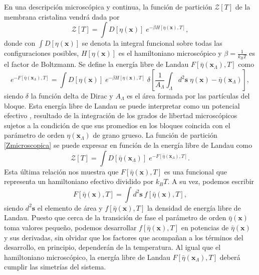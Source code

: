 En una descripción microscópica y continua, la función de partición
$\mathcal{Z}[T]$ de la membrana cristalina vendrá dada por
\begin{equation}\label{Zmicroscopica}
\mathcal{Z}[T]=\int D[\eta(\mathbf{x})]\; e^{-\beta H[\eta(\mathbf{x}),T]},
\end{equation}
donde con $\int D[\eta(\mathbf{x})]$ se denota la integral funcional sobre
todas las configuraciones posibles, $H[\eta(\mathbf{x})]$ es el hamiltoniano
microscópico y $\beta=\frac{1}{k_BT}$ es el factor de Boltzmann. Se define la
energía libre de Landau $F[\bar{\eta}(\mathbf{x}_{\Lambda}),T]$ como 
\begin{equation*}
e^{-F[\bar{\eta}(\mathbf{x}_{\Lambda}),T]}=\int D[\eta(\mathbf{x})]\; e^{-\beta
  H[\eta(\mathbf{x}),T]}
  \;\delta\left[\frac{1}{A_{\Lambda}}\int_{\Lambda} d^2\mathbf{s}\; \eta(\mathbf{x})-\bar{\eta}(\mathbf{x}_{\Lambda})\right],
\end{equation*}
siendo $\delta$ la función delta de Dirac y $A_{\Lambda}$ es el área
formada por las partículas del bloque. Esta energía libre de Landau se puede
interpretar como un potencial efectivo \cite{Heller:Method}, resultado de la integración de los
grados de libertad microscópicos sujetos a la condición de que sus promedios
en los  bloques coincida con el parámetro de orden
$\eta(\mathbf{x}_{\Lambda})$ de grano grueso. La función de partición
\eqref{Zmicroscopica} se puede expresar en función de la energía libre de
Landau como
\begin{equation*}
\mathcal{Z}[T]=\int D[\bar{\eta}(\mathbf{x}_{\Lambda})]\; e^{-F[\bar{\eta}(\mathbf{x}_{\Lambda}),T]}.
\end{equation*}
Esta última relación nos muestra que $F[\bar{\eta}(\mathbf{x}),T]$ es una funcional
que representa un hamiltoniano efectivo dividido por $k_BT$. A su vez, podemos
escribir 
\begin{equation*}
F[\bar{\eta}(\mathbf{x}),T]=\int\! d^2\mathbf{s}\ f[\bar{\eta}(\mathbf{x}),T],
\end{equation*}
siendo $d^2\mathbf{s}$ el elemento de área y $f[\bar{\eta}(\mathbf{x}),T]$ la
densidad de energía libre de Landau. Puesto que cerca de la transición de fase
el parámetro de orden $\bar{\eta}(\mathbf{x})$ toma valores pequeño, podemos
desarrollar $f[\bar{\eta}(\mathbf{x}),T]$ en potencias de
$\bar{\eta}(\mathbf{x})$ y sus derivadas, sin olvidar que los factores que
acompañan a los términos del desarrollo, en principio, dependerán de la
temperatura. Al igual que el hamiltoniano microscópico, la energía libre de Landau
$F[\bar{\eta}(\mathbf{x}_{\Lambda}),T]$ deberá cumplir las simetrías del sistema.

